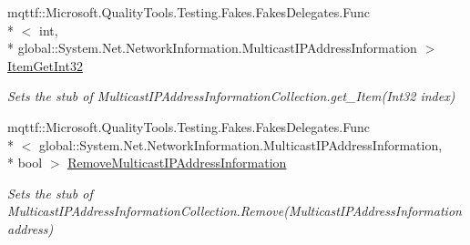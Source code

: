 \begin{DoxyCompactItemize}
mqttf\-::\-Microsoft.\-Quality\-Tools.\-Testing.\-Fakes.\-Fakes\-Delegates.\-Func\\*
$<$ int, \\*
global\-::\-System.\-Net.\-Network\-Information.\-Multicast\-I\-P\-Address\-Information $>$ \hyperlink{class_system_1_1_net_1_1_network_information_1_1_fakes_1_1_stub_multicast_i_p_address_information_collection_a4fd9bfbe6949384f591935083bf9813c}{Item\-Get\-Int32}
\begin{DoxyCompactList}\small\item\em Sets the stub of Multicast\-I\-P\-Address\-Information\-Collection.\-get\-\_\-\-Item(\-Int32 index)\end{DoxyCompactList}\item 
mqttf\-::\-Microsoft.\-Quality\-Tools.\-Testing.\-Fakes.\-Fakes\-Delegates.\-Func\\*
$<$ global\-::\-System.\-Net.\-Network\-Information.\-Multicast\-I\-P\-Address\-Information, \\*
bool $>$ \hyperlink{class_system_1_1_net_1_1_network_information_1_1_fakes_1_1_stub_multicast_i_p_address_information_collection_a502d0d89d250519ffd723f7e856f0297}{Remove\-Multicast\-I\-P\-Address\-Information}
\begin{DoxyCompactList}\small\item\em Sets the stub of Multicast\-I\-P\-Address\-Information\-Collection.\-Remove(\-Multicast\-I\-P\-Address\-Information address)\end{DoxyCompactList}\end{DoxyCompactItemize}
